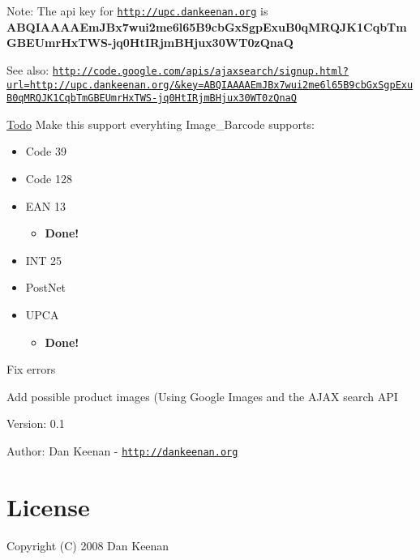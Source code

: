 \begin{Desc}
\item[Note:]The api key for \href{http://upc.dankeenan.org}{\tt http://upc.dankeenan.org} is {\bf ABQIAAAAEmJBx7wui2me6l65B9cbGxSgpExuB0qMRQJK1CqbTmGBEUmrHxTWS-jq0HtIRjmBHjux30WT0zQnaQ} \end{Desc}
\begin{Desc}
\item[See also:]\href{http://code.google.com/apis/ajaxsearch/signup.html?url=http://upc.dankeenan.org/&key=ABQIAAAAEmJBx7wui2me6l65B9cbGxSgpExuB0qMRQJK1CqbTmGBEUmrHxTWS-jq0HtIRjmBHjux30WT0zQnaQ}{\tt http://code.google.com/apis/ajaxsearch/signup.html?url=http://upc.dankeenan.org/\&key=ABQIAAAAEmJBx7wui2me6l65B9cbGxSgpExuB0qMRQJK1CqbTmGBEUmrHxTWS-jq0HtIRjmBHjux30WT0zQnaQ} \end{Desc}
\begin{Desc}
\item[\hyperlink{todo__todo000001}{Todo}]Make this support everyhting Image\_\-Barcode supports:\begin{itemize}
\item Code 39\item Code 128\item EAN 13\begin{itemize}
\item {\bf Done!} \end{itemize}
\item INT 25\item PostNet\item UPCA\begin{itemize}
\item {\bf Done!} \end{itemize}
\end{itemize}


Fix errors 

Add possible product images (Using Google Images and the AJAX search API\end{Desc}
\begin{Desc}
\item[Version:]0.1 \end{Desc}
\begin{Desc}
\item[Author:]Dan Keenan - \href{http://dankeenan.org}{\tt http://dankeenan.org} \end{Desc}
\hypertarget{index_license}{}\section{License}\label{index_license}
Copyright (C) 2008 Dan Keenan

